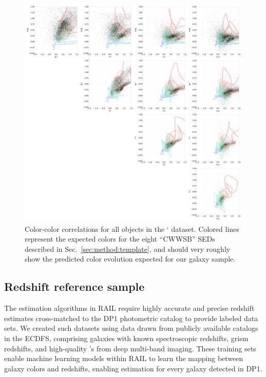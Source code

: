 \begin{figure}
    \centering
    \includegraphics[width=\linewidth]{figures/color_v_color.pdf}
    \caption{Color-color correlations for all objects in the ` dataset.  Colored lines represent the expected colors for the eight ``CWWSB'' SEDs described in Sec.~\ref{sec:method:template}, and should very roughly show the predicted color evolution expected for our galaxy sample.}
    \label{fig:dp_color_v_color}
\end{figure}

\pagebreak

\subsection{Redshift reference sample}
\label{sec:data:reference}

The \photoz estimation algorithms in RAIL require highly accurate and precise redshift estimates cross-matched to the DP1 photometric catalog to provide labeled  data sets.  We created such datasets using data drawn from publicly available catalogs in the ECDFS, comprising galaxies with known spectroscopic redshifts, grism redshifts, and high-quality \photoz's from deep multi-band imaging.  These training sets enable machine learning models within RAIL to learn the mapping between galaxy colors and redshifts, enabling \photoz estimation for every galaxy detected in DP1.

